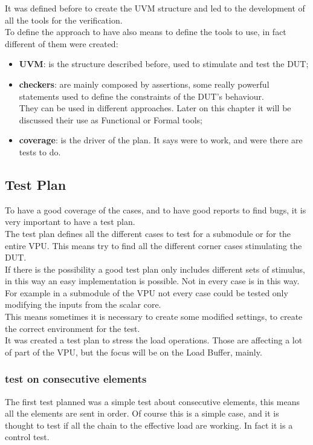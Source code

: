 It was defined before to create the UVM structure and led to the development of all the tools for the verification. \\
To define the approach to have also means to define the tools to use, in fact different of them were created:
\begin{itemize}
    \item \textbf{UVM}: is the structure described before, used to stimulate and test the DUT;
    
    \item \textbf{checkers}: are mainly composed by assertions, some really powerful statements used to define the constraints of the DUT's behaviour. \\
    They can be used in different approaches. Later on this chapter it will be discussed their use as Functional or Formal tools;
    
    \item \textbf{coverage}: is the driver of the plan. It says were to work, and were there are tests to do. 
    
\end{itemize}
\subsection{Test Plan}
To have a good coverage of the cases, and to have good reports to find bugs, it is very important to have a test plan.\\

The test plan defines all the different cases to test for a submodule or for the entire VPU. This means try to find all the different corner cases stimulating the DUT.\\

If there is the possibility a good test plan only includes different sets of stimulus, in this way an easy implementation is possible. Not in every case is in this way. For example in a submodule of the VPU not every case could be tested only modifying the inputs from the scalar core.\\
This means sometimes it is necessary to create some modified settings, to create the correct environment for the test.\\

It was created a test plan to stress the load operations. Those are affecting a lot of part of the VPU, but the focus will be on the Load Buffer, mainly.\\

\subsubsection{test on consecutive elements}
The first test planned was a simple test about consecutive elements, this means all the elements are sent in order. Of course this is a simple case, and it is thought to test if all the chain to the effective load are working. In fact it is a control test.\\

